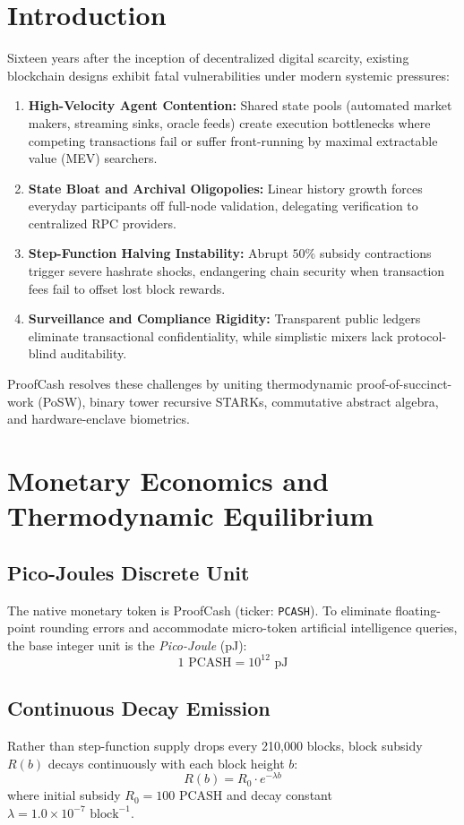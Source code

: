 \documentclass[10pt,conference,letterpaper]{IEEEtran}
\begin{document}
\section{Introduction}
Sixteen years after the inception of decentralized digital scarcity, existing blockchain designs exhibit fatal vulnerabilities under modern systemic pressures:
\begin{enumerate}
    \item \textbf{High-Velocity Agent Contention:} Shared state pools (automated market makers, streaming sinks, oracle feeds) create execution bottlenecks where competing transactions fail or suffer front-running by maximal extractable value (MEV) searchers.
    \item \textbf{State Bloat and Archival Oligopolies:} Linear history growth forces everyday participants off full-node validation, delegating verification to centralized RPC providers.
    \item \textbf{Step-Function Halving Instability:} Abrupt $50\%$ subsidy contractions trigger severe hashrate shocks, endangering chain security when transaction fees fail to offset lost block rewards.
    \item \textbf{Surveillance and Compliance Rigidity:} Transparent public ledgers eliminate transactional confidentiality, while simplistic mixers lack protocol-blind auditability.
\end{enumerate}

ProofCash resolves these challenges by uniting thermodynamic proof-of-succinct-work (PoSW), binary tower recursive STARKs, commutative abstract algebra, and hardware-enclave biometrics.

\section{Monetary Economics and Thermodynamic Equilibrium}
\subsection{Pico-Joules Discrete Unit}
The native monetary token is ProofCash (ticker: \texttt{PCASH}). To eliminate floating-point rounding errors and accommodate micro-token artificial intelligence queries, the base integer unit is the \textit{Pico-Joule} (pJ):
\begin{equation}
1 \text{ PCASH} = 10^{12} \text{ pJ}
\end{equation}

\subsection{Continuous Decay Emission}
Rather than step-function supply drops every 210,000 blocks, block subsidy $R(b)$ decays continuously with each block height $b$:
\begin{equation}
R(b) = R_0 \cdot e^{-\lambda b}
\end{equation}
where initial subsidy $R_0 = 100 \text{ PCASH}$ and decay constant $\lambda = 1.0 \times 10^{-7} \text{ block}^{-1}$.
\end{document}
